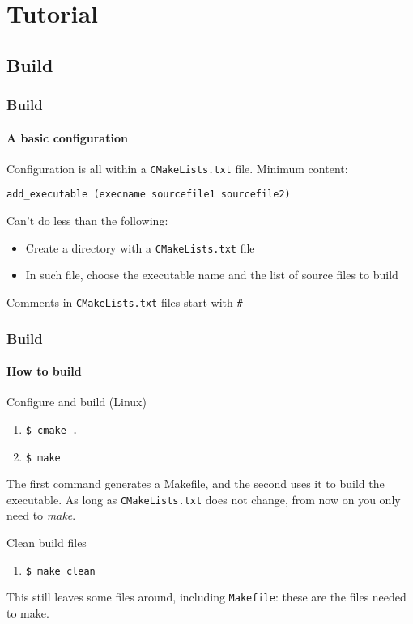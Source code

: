 \section{Tutorial}

\subsection{Build}

\begin{frame}[fragile]
\frametitle{Build}
\framesubtitle{A basic configuration}

Configuration is all within a \texttt{CMakeLists.txt} file. Minimum content:

\begin{verbatim}
add_executable (execname sourcefile1 sourcefile2)
\end{verbatim}
  
\begin{block}{Can't do less than the following:}
\begin{itemize}
\item Create a directory with a \texttt{CMakeLists.txt} file
\item In such file, choose the executable name and the list of source files to build
\end{itemize}
Comments in \texttt{CMakeLists.txt} files start with \texttt{\#}
\end{block}

\end{frame}

\begin{frame}
\frametitle{Build}
\framesubtitle{How to build}

\begin{block}{Configure and build (Linux)}
\begin{enumerate}
\item \texttt{\$ cmake .} 
\item \texttt{\$ make}
\end{enumerate}
The first command generates a Makefile, and the second uses it to build the executable. As long as \texttt{CMakeLists.txt} does not change, from now on you only need to {\em make}.
\end{block}
\pause
\begin{block}{Clean build files}
\begin{enumerate}
\item \texttt{\$ make clean}
\end{enumerate}
This still leaves some files around, including \texttt{Makefile}: these are the files needed to make.
\end{block}

\end{frame}

